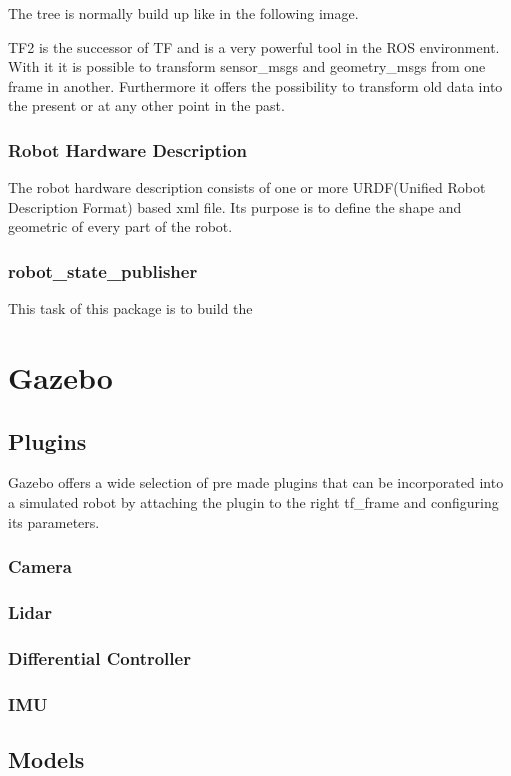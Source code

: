 The tree is normally build up like in the following image. 

TF2 is the successor of TF and is a very powerful tool in the ROS environment. With it it is possible to transform sensor\_msgs and geometry\_msgs from one frame in another. Furthermore it offers the possibility to transform old data into the present or at any other point in the past.

\subsubsection{Robot Hardware Description}
The robot hardware description consists of one or more URDF(Unified Robot Description Format) based xml file. Its purpose is to define the shape and geometric of every part of the robot. 

\subsubsection{robot\_state\_publisher}
This task of this package is to build the 

\section{Gazebo}


\subsection{Plugins}
Gazebo offers a wide selection of pre made plugins that can be incorporated into a simulated robot by attaching the plugin to the right tf\_frame and configuring its parameters.
\subsubsection{Camera}
\subsubsection{Lidar}
\subsubsection{Differential Controller}
\subsubsection{IMU}
\subsection{Models}


